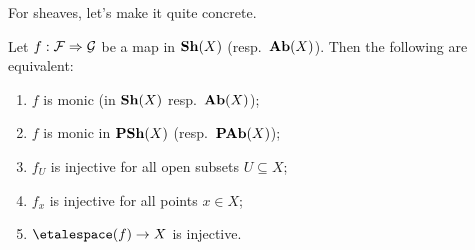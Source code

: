 For sheaves, let's make it quite concrete.

\begin{lem}\label{lem:monomorphisms-sheaves}
Let \(f\colon\mathcal F\To\mathcal G\) be a map in \(\operatorname{\mathbf{Sh}}(X)\) (resp.~\(\operatorname{\mathbf{Ab}}(X)\)).
Then the following are equivalent:
\begin{enumerate}
\item\label{lem:monomorphisms-sheaves:monic-sheaves} \(f\) is monic (in \(\operatorname{\mathbf{Sh}}(X)\) resp.~\(\operatorname{\mathbf{Ab}}(X)\));
\item\label{lem:monomorphisms-sheaves:monic-presheaves} \(f\) is monic in \(\operatorname{\mathbf{PSh}}(X)\) (resp.~\(\operatorname{\mathbf{PAb}}(X)\));
\item\label{lem:monomorphisms-sheaves:injective-open} \(f_U\) is injective for all open subsets \(U\subseteq X\);
\item\label{lem:monomorphisms-sheaves:injective-stalk} \(f_x\) is injective for all points \(x\in X\);
\item\label{lem:monomorphisms-sheaves:injective-etale-space} \(\etalespace(f)\to X\) is injective.
\end{enumerate}
\end{lem}
